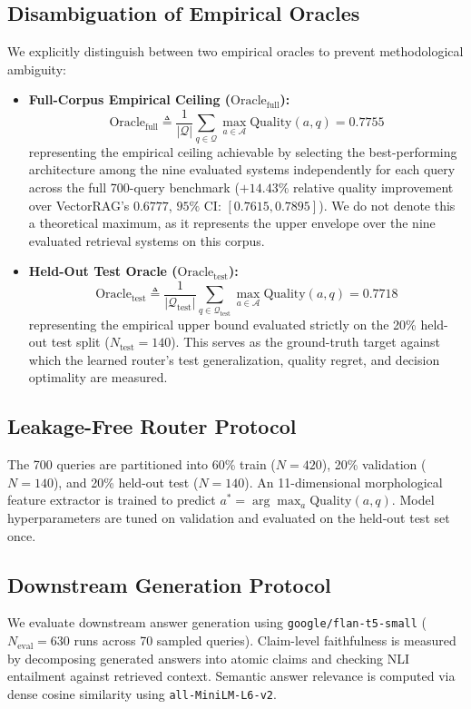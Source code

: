 \documentclass[10pt,twocolumn,letterpaper]{article}
\begin{document}
\subsection{Disambiguation of Empirical Oracles}
We explicitly distinguish between two empirical oracles to prevent methodological ambiguity:
\begin{itemize}
    \item \textbf{Full-Corpus Empirical Ceiling ($\text{Oracle}_{\text{full}}$):}
    \begin{equation}
        \text{Oracle}_{\text{full}} \triangleq \frac{1}{|\mathcal{Q}|} \sum_{q \in \mathcal{Q}} \max_{a \in \mathcal{A}} \text{Quality}(a, q) = \mathbf{0.7755}
    \end{equation}
    representing the empirical ceiling achievable by selecting the best-performing architecture among the nine evaluated systems independently for each query across the full 700-query benchmark ($+14.43\%$ relative quality improvement over VectorRAG's $0.6777$, $95\%$ CI: $[0.7615, 0.7895]$). We do not denote this a theoretical maximum, as it represents the upper envelope over the nine evaluated retrieval systems on this corpus.
    \item \textbf{Held-Out Test Oracle ($\text{Oracle}_{\text{test}}$):}
    \begin{equation}
        \text{Oracle}_{\text{test}} \triangleq \frac{1}{|\mathcal{Q}_{\text{test}}|} \sum_{q \in \mathcal{Q}_{\text{test}}} \max_{a \in \mathcal{A}} \text{Quality}(a, q) = \mathbf{0.7718}
    \end{equation}
    representing the empirical upper bound evaluated strictly on the 20\% held-out test split ($N_{\text{test}} = 140$). This serves as the ground-truth target against which the learned router's test generalization, quality regret, and decision optimality are measured.
\end{itemize}

\subsection{Leakage-Free Router Protocol}
The 700 queries are partitioned into 60\% train ($N=420$), 20\% validation ($N=140$), and 20\% held-out test ($N=140$). An 11-dimensional morphological feature extractor is trained to predict $a^* = \arg\max_a \text{Quality}(a, q)$. Model hyperparameters are tuned on validation and evaluated on the held-out test set once.

\subsection{Downstream Generation Protocol}
We evaluate downstream answer generation using \texttt{google/flan-t5-small} ($N_{\text{eval}} = 630$ runs across 70 sampled queries). Claim-level faithfulness is measured by decomposing generated answers into atomic claims and checking NLI entailment against retrieved context. Semantic answer relevance is computed via dense cosine similarity using \texttt{all-MiniLM-L6-v2}.
\end{document}
